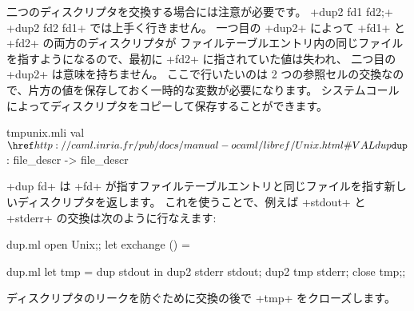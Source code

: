 二つのディスクリプタを交換する場合には注意が必要です。
\ml+dup2 fd1 fd2;+ \ml+dup2 fd2 fd1+ では上手く行きません。
一つ目の \ml+dup2+ によって \ml+fd1+ と \ml+fd2+ の両方のディスクリプタが
ファイルテーブルエントリ内の同じファイルを指すようになるので、最初に \ml+fd2+ に指されていた値は失われ、
二つ目の \ml+dup2+ は意味を持ちません。
ここで行いたいのは 2 つの参照セルの交換なので、片方の値を保存しておく一時的な変数が必要になります。
システムコール  によってディスクリプタをコピーして保存することができます。
%
\begin{listingcodefile}{tmpunix.mli}
val $\libvalue{Unix}{dup}$ : file_descr -> file_descr
\end{listingcodefile}
%
\ml+dup fd+ は \ml+fd+ が指すファイルテーブルエントリと同じファイルを指す新しいディスクリプタを返します。
これを使うことで、例えば \ml+stdout+ と \ml+stderr+ の交換は次のように行なえます:
%
\begin{codefile}{dup.ml}
open Unix;;
let exchange () =
\end{codefile}
%
\begin{listingcodefile}{dup.ml}
let tmp = dup stdout in
dup2 stderr stdout;
dup2 tmp stderr;
close tmp;;
\end{listingcodefile}
%
ディスクリプタのリークを防ぐために交換の後で \ml+tmp+ をクローズします。

